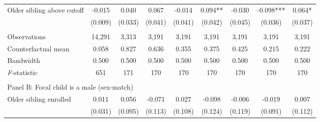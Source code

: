 \begin{table}[!htbp]
{{\begin{tabular}{lcccccccc}
Older sibling above cutoff&      -0.015   &       0.040   &       0.067   &      -0.014   &       0.094** &      -0.030   &      -0.098***&       0.064*  \\
                    &     (0.009)   &     (0.033)   &     (0.041)   &     (0.041)   &     (0.042)   &     (0.045)   &     (0.036)   &     (0.037)   \\
                    &               &               &               &               &               &               &               &               \\
Observations        &      14,291   &       3,313   &       3,191   &       3,191   &       3,191   &       3,191   &       3,191   &       3,191   \\
Counterfactual mean &       0.058   &       0.827   &       0.636   &       0.355   &       0.375   &       0.425   &       0.215   &       0.222   \\
Bandwidth           &       0.500   &       0.500   &       0.500   &       0.500   &       0.500   &       0.500   &       0.500   &       0.500   \\
\textit{F}-statistic&         651   &         171   &         170   &         170   &         170   &         170   &         170   &         170   \\
 
&  &  &  &  \\
\multicolumn{10}{l}{Panel B: Focal child is a male (sex-match)} \\
Older sibling enrolled&       0.011   &       0.056   &      -0.071   &       0.027   &      -0.098   &      -0.006   &      -0.019   &       0.007   \\
                    &     (0.031)   &     (0.095)   &     (0.113)   &     (0.108)   &     (0.124)   &     (0.119)   &     (0.091)   &     (0.112)   \\
 

\end{tabular}}}
\end{table}
